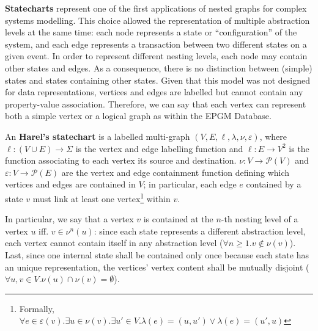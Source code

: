 
\textbf{Statecharts} \cite{statecharts} represent one of the first applications of nested graphs for complex systems modelling. This choice allowed the representation of multiple abstraction levels at the same time: each node represents a  state or ``configuration'' of the system, and each edge represents a transaction between two different states on a given event. In order to represent different nesting levels, each node may contain other states and edges. As a consequence,  there is no distinction between (simple) states and states containing other states. Given that this model was not designed for data representations, vertices and edges are labelled but cannot contain any property-value association. Therefore, we can say that each vertex can represent both a simple vertex or a logical graph as within the EPGM Database. 

%

\begin{definition}
An \textbf{Harel's statechart}  is a labelled multi-graph $(V,E,\ell,\lambda,\nu,\varepsilon)$, where $\ell\colon(V\cup E)\to  \Sigma$ is the vertex and edge labelling function and $\ell\colon E\to V^2$ is the function associating to each vertex its source and destination. $\nu\colon V \to\mathcal{P}(V)$ and $\varepsilon\colon V \to\mathcal{P}(E)$ are the vertex and edge containment function defining which vertices and edges are contained in $V$; in particular, each edge $e$ contained by a state $v$ must link at least one vertex\footnote{Formally, $\forall e\in \varepsilon(v).\exists u\in \nu(v).\exists u'\in V. \lambda(e)=(u,u')\vee \lambda(e)=(u',u)$} within $v$.

In particular, we say that a vertex $v$ is contained at the $n$-th nesting level of a vertex $u$ iff. $v\in \nu^n(u)$: since each state represents a different abstraction level, each vertex cannot contain itself in any abstraction level ($\forall n\geq 1. v\notin \nu(v)$).
Last, since one internal state shall be contained only once because each state has an unique representation, the vertices' vertex content shall be mutually disjoint ($\forall u,v\in V. \nu(u)\cap \nu(v)=\emptyset$).
\end{definition} 

